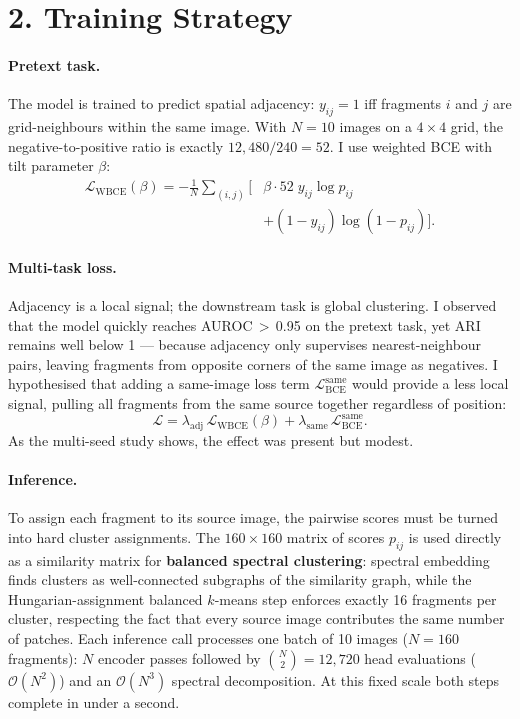 \documentclass[10pt, a4paper, twocolumn]{article}
\begin{document}
\section*{2. Training Strategy}

\paragraph{Pretext task.}
The model is trained to predict spatial adjacency: $y_{ij}=1$ iff fragments
$i$ and $j$ are grid-neighbours within the same image. With $N=10$ images on
a $4{\times}4$ grid, the negative-to-positive ratio is exactly
$12{,}480/240 = 52$. I use weighted BCE with tilt parameter $\beta$:
\begin{align*}
  \mathcal{L}_{\text{WBCE}}(\beta) = -\tfrac{1}{N}\!\sum_{(i,j)}\bigl[
  &\beta\cdot 52\; y_{ij}\log p_{ij} \\
  &+ (1-y_{ij})\log(1-p_{ij})\bigr].
\end{align*}

\paragraph{Multi-task loss.}
Adjacency is a local signal; the downstream task is global clustering.
I observed that the model quickly reaches AUROC\,$>$\,0.95 on the pretext
task, yet ARI remains well below 1 --- because adjacency only supervises
nearest-neighbour pairs, leaving fragments from opposite corners of the same
image as negatives. I hypothesised that adding a same-image loss term
$\mathcal{L}_{\text{BCE}}^{\text{same}}$ would provide a less local signal,
pulling all fragments from the same source together regardless of position:
\[
  \mathcal{L} = \lambda_{\text{adj}}\,\mathcal{L}_{\text{WBCE}}(\beta)
              + \lambda_{\text{same}}\,\mathcal{L}_{\text{BCE}}^{\text{same}}.
\]
As the multi-seed study shows, the effect was present but modest.

\paragraph{Inference.}
To assign each fragment to its source image, the pairwise scores must be
turned into hard cluster assignments. The $160{\times}160$ matrix of scores $p_{ij}$
is used directly as a similarity matrix for \textbf{balanced spectral
clustering}: spectral embedding finds clusters as well-connected subgraphs of
the similarity graph, while the Hungarian-assignment balanced $k$-means step
enforces exactly 16 fragments per cluster, respecting the fact that every
source image contributes the same number of patches.
Each inference call processes one batch of 10 images
($N=160$ fragments): $N$ encoder passes followed by $\binom{N}{2}=12{,}720$
head evaluations ($\mathcal{O}(N^2)$) and an $\mathcal{O}(N^3)$ spectral
decomposition. At this fixed scale both steps complete in under a second.
\end{document}
